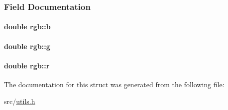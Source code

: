 \subsubsection{\-Field \-Documentation}
\hypertarget{structrgb_aa3e45a2c26ad435fe29dfea49f16831e}{
\paragraph[{b}]{\setlength{\rightskip}{0pt plus 5cm}double {\bf rgb\-::b}}}\label{structrgb_aa3e45a2c26ad435fe29dfea49f16831e}
\hypertarget{structrgb_a1c51cad47a05c797643776f9357a8749}{
\paragraph[{g}]{\setlength{\rightskip}{0pt plus 5cm}double {\bf rgb\-::g}}}\label{structrgb_a1c51cad47a05c797643776f9357a8749}
\hypertarget{structrgb_ad5a38e43f70fb57d6da052745ea5ff90}{
\paragraph[{r}]{\setlength{\rightskip}{0pt plus 5cm}double {\bf rgb\-::r}}}\label{structrgb_ad5a38e43f70fb57d6da052745ea5ff90}


\-The documentation for this struct was generated from the following file\-:\begin{DoxyCompactItemize}
\item 
src/\hyperlink{utils_8h}{utils.\-h}\end{DoxyCompactItemize}
